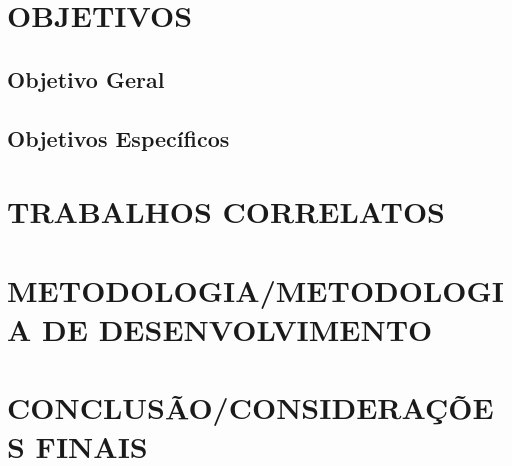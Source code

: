 \section{OBJETIVOS}
\label{sec:objetivos}

\subsection{Objetivo Geral}
\label{subsec:objgeral}

\subsection{Objetivos Específicos}
\label{subsec:objespc}

\section{TRABALHOS CORRELATOS}
\label{sec:estadoarte}

\section{METODOLOGIA/METODOLOGIA DE DESENVOLVIMENTO} %
\label{sec:metodologia}

\section{CONCLUSÃO/CONSIDERAÇÕES FINAIS} %
\label{sec:conclusao}

